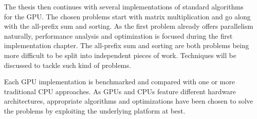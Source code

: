 The thesis then continues with several implementations of standard algorithms for the GPU. The chosen problems start with matrix multiplication and go along with the all-prefix sum and sorting. As the first problem already offers parallelism naturally, performance analysis and optimization is focused during the first implementation chapter. The all-prefix sum and sorting are both problems being more difficult to be split into independent pieces of work. Techniques will be discussed to tackle such kind of problems.

Each GPU implementation is benchmarked and compared with one or more traditional CPU approaches. As GPUs and CPUs feature different hardware architectures, appropriate algorithms and optimizations have been chosen to solve the problems by exploiting the underlying platform at best.
